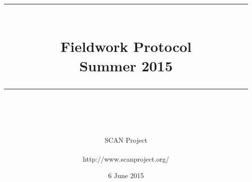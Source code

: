 \documentclass[idxtotoc,hyperref,openany]{labbook} %
\newcommand{\HRule}{\rule{\linewidth}{0.5mm}} %
\begin{document}

\frontmatter %
\title{
\begin{center}
\HRule \\[0.4cm]
{\Huge \bfseries Fieldwork Protocol \\[0.5cm] \Large Summer 2015}\\[0.4cm] %
\HRule \\[1.5cm]
\end{center}
}
\author{\Huge SCAN Project\\ \\ \LARGE http://www.scanproject.org/ \\[2cm]} %
\date{6 June 2015} %
\maketitle

\tableofcontents

\mainmatter %











\end{document}
